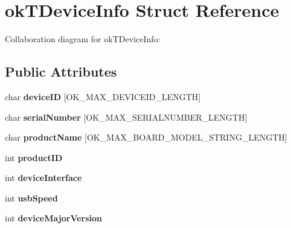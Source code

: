 \hypertarget{structokTDeviceInfo}{\section{ok\+T\+Device\+Info Struct Reference}
\label{structokTDeviceInfo}
}


Collaboration diagram for ok\+T\+Device\+Info\+:
\subsection*{Public Attributes}
\begin{DoxyCompactItemize}
\item 
\hypertarget{structokTDeviceInfo_a1b3f1bdaa9322a8ec311c1bbc8e5352b}{char {\bfseries device\+I\+D} \mbox{[}O\+K\+\_\+\+M\+A\+X\+\_\+\+D\+E\+V\+I\+C\+E\+I\+D\+\_\+\+L\+E\+N\+G\+T\+H\mbox{]}}\label{structokTDeviceInfo_a1b3f1bdaa9322a8ec311c1bbc8e5352b}

\item 
\hypertarget{structokTDeviceInfo_a132318715d3b79b4160b8baaf34fe1ed}{char {\bfseries serial\+Number} \mbox{[}O\+K\+\_\+\+M\+A\+X\+\_\+\+S\+E\+R\+I\+A\+L\+N\+U\+M\+B\+E\+R\+\_\+\+L\+E\+N\+G\+T\+H\mbox{]}}\label{structokTDeviceInfo_a132318715d3b79b4160b8baaf34fe1ed}

\item 
\hypertarget{structokTDeviceInfo_ad25741b80cd1143ab7d2f9b4a9171197}{char {\bfseries product\+Name} \mbox{[}O\+K\+\_\+\+M\+A\+X\+\_\+\+B\+O\+A\+R\+D\+\_\+\+M\+O\+D\+E\+L\+\_\+\+S\+T\+R\+I\+N\+G\+\_\+\+L\+E\+N\+G\+T\+H\mbox{]}}\label{structokTDeviceInfo_ad25741b80cd1143ab7d2f9b4a9171197}

\item 
\hypertarget{structokTDeviceInfo_a8499afc882f767f8643e6528b2b002e8}{int {\bfseries product\+I\+D}}\label{structokTDeviceInfo_a8499afc882f767f8643e6528b2b002e8}

\item 
\hypertarget{structokTDeviceInfo_afd671bbe8c629985459b698c5c4f0c11}{int {\bfseries device\+Interface}}\label{structokTDeviceInfo_afd671bbe8c629985459b698c5c4f0c11}

\item 
\hypertarget{structokTDeviceInfo_a45b875404d9c7e8f67d9b25edc74371e}{int {\bfseries usb\+Speed}}\label{structokTDeviceInfo_a45b875404d9c7e8f67d9b25edc74371e}

\item 
\hypertarget{structokTDeviceInfo_a9546abf1068f50365ed4b1eaf576076e}{int {\bfseries device\+Major\+Version}}\label{structokTDeviceInfo_a9546abf1068f50365ed4b1eaf576076e}


\end{DoxyCompactItemize}
